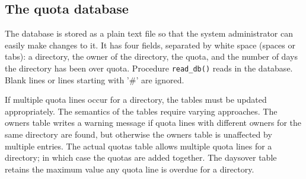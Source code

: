\subsection*{The quota database}

The database is stored as a plain text file so that the system
administrator can easily make changes to it. It has four fields,
separated by white space (spaces or tabs): a directory, the owner of
the directory, the quota, and the number of days the directory has been
over quota. Procedure \texttt{read\_db()} reads in the database. Blank
lines or lines starting with '\#' are
ignored.


If multiple quota lines occur for a directory, the tables must be
updated appropriately. The semantics of the tables require varying
approaches. The owners table writes a warning message if quota lines
with different owners for the same directory are found, but otherwise
the owners table is unaffected by multiple entries. The actual quotas
table allows multiple quota lines for a directory; in which case the
quotas are added together. The daysover table retains the maximum value
any quota line is overdue for a directory.

